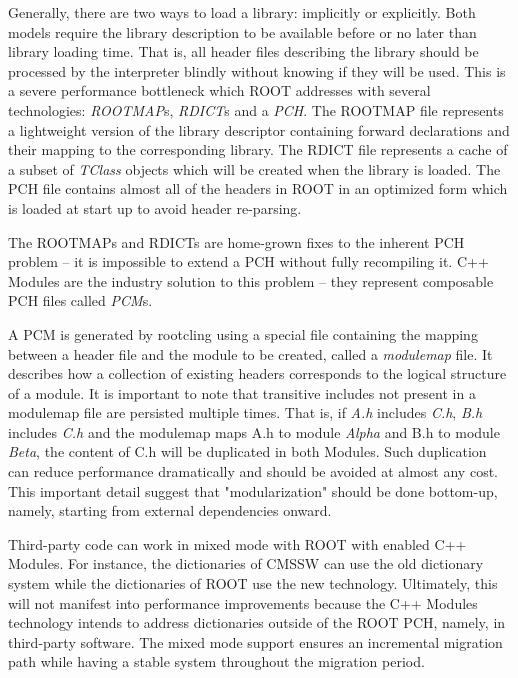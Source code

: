 \documentclass[12pt]{iopart}
\begin{document}
Generally, there are two ways to load a library: implicitly or explicitly. Both models require the library description to be available before or no later than library loading time. That is, all header files describing the library should be processed by the interpreter blindly without knowing if they will be used. This is a severe performance bottleneck which ROOT addresses with several technologies: \textit{ROOTMAP}s, \textit{RDICT}s and a \textit{PCH}. The ROOTMAP file represents a lightweight version of the library descriptor containing forward declarations and their mapping to the corresponding library. The RDICT file represents a cache of a subset of \textit{TClass} objects which will be created when the library is loaded. The PCH file contains almost all of the headers in ROOT in an optimized form which is loaded at start up to avoid header re-parsing.

The ROOTMAPs and RDICTs are home-grown fixes to the inherent PCH problem -- it is impossible to extend a PCH without fully recompiling it. C++ Modules are the industry solution to this problem -- they represent composable PCH files called \textit{PCM}s.

A PCM is generated by rootcling using a special file containing the mapping between a header file and the module to be created, called a \textit{modulemap} file. It describes how a collection of existing headers corresponds to the logical structure of a module. It is important to note that transitive includes not present in a modulemap file are persisted multiple times. That is, if \textit{A.h} includes \textit{C.h}, \textit{B.h} includes \textit{C.h} and the modulemap maps A.h to module \textit{Alpha} and B.h to module \textit{Beta}, the content of C.h will be duplicated in both Modules. Such duplication can reduce performance dramatically and should be avoided at almost any cost. This important detail suggest that "modularization" should be done bottom-up, namely, starting from external dependencies onward.

Third-party code can work in mixed mode with ROOT with enabled C++ Modules. For instance, the dictionaries of CMSSW can use the old dictionary system while the dictionaries of ROOT use the new technology. Ultimately, this will not manifest into performance improvements because the C++ Modules technology intends to address dictionaries outside of the ROOT PCH, namely, in third-party software. The mixed mode support ensures an incremental migration path while having a stable system throughout the migration period. 
\end{document}
